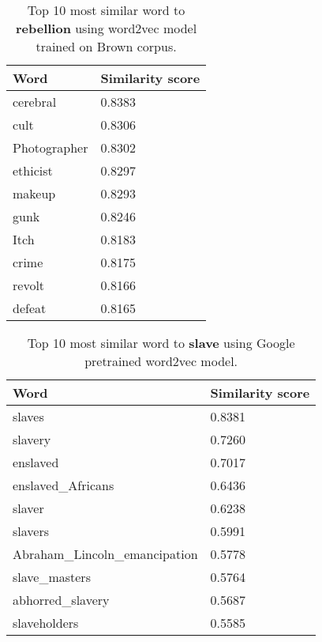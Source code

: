 \begin{table}[h!]
    \centering
    \begin{tabular}{|l|l|}
    \hline
        Word & Similarity score \\
        \hline
        cerebral & 0.8383 \\
        cult & 0.8306 \\
        Photographer & 0.8302 \\
        ethicist & 0.8297 \\
        makeup & 0.8293 \\
        gunk & 0.8246 \\
        Itch & 0.8183 \\
        crime & 0.8175 \\
        revolt & 0.8166 \\
        defeat & 0.8165 \\
        \hline
    \end{tabular}
    \caption{Top 10 most similar word to \textbf{rebellion} using word2vec model trained on Brown corpus.}
    \label{tab:rebellion_brown}
\end{table}


\begin{table}[h!]
    \centering
    \begin{tabular}{|l|l|}
    \hline
        Word & Similarity score \\
        \hline
        slaves & 0.8381 \\
        slavery & 0.7260 \\
        enslaved & 0.7017\\
        enslaved\_Africans & 0.6436 \\
        slaver & 0.6238 \\
        slavers & 0.5991\\
        Abraham\_Lincoln\_emancipation & 0.5778\\
        slave\_masters & 0.5764 \\
        abhorred\_slavery & 0.5687 \\
        slaveholders & 0.5585 \\
        \hline
    \end{tabular}
    \caption{Top 10 most similar word to \textbf{slave} using Google pretrained word2vec model.}
    \label{tab:slave_google}
\end{table}

